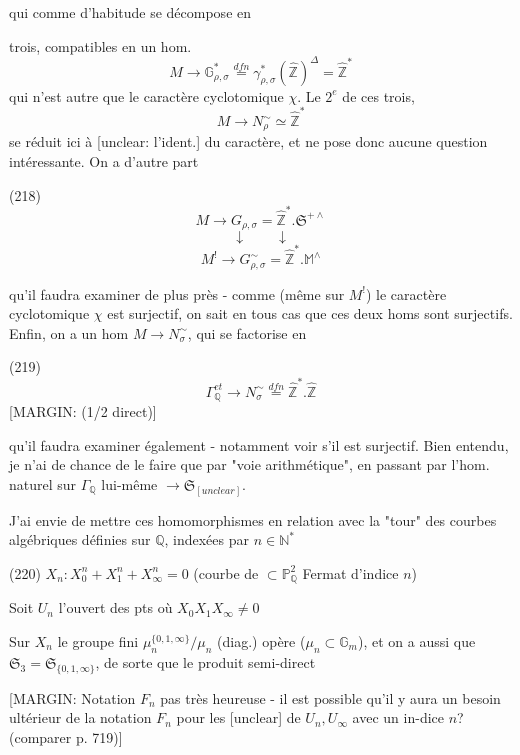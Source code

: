 qui comme d'habitude se décompose en

\newpage


trois, compatibles en un hom.
$$M \longrightarrow \mathbb{G}_{\rho, \sigma}^* \overset{dfn}{=} \gamma_{\rho, \sigma}^*(\hat{\mathbb{Z}})^\Delta = \hat{\mathbb{Z}}^*$$
qui n'est autre que le caractère cyclotomique $\chi$. Le $2^e$ de ces trois,
$$M \longrightarrow N_\rho^\sim \simeq \hat{\mathbb{Z}}^*$$
se réduit ici à [unclear: l'ident.] du caractère, et ne pose donc aucune question intéressante. On a d'autre part

(218)
$$M \longrightarrow G_{\rho, \sigma} = \hat{\mathbb{Z}}^* . \mathfrak{S}^{+ \wedge}$$
$$\downarrow \qquad \downarrow$$
$$M^! \longrightarrow G_{\rho, \sigma}^\sim = \hat{\mathbb{Z}}^* . \mathbb{M}^\wedge$$

qu'il faudra examiner de plus près - comme (même sur $M^!$) le caractère cyclotomique $\chi$ est surjectif, on sait en tous cas que ces deux homs sont surjectifs. Enfin, on a un hom $M \longrightarrow N_\sigma^\sim$, qui se factorise en

(219)
$$\Gamma_{\mathbb{Q}}^{et} \longrightarrow N_\sigma^\sim \overset{dfn}{=} \hat{\mathbb{Z}}^* . \hat{\mathbb{Z}}$$
[MARGIN: (1/2 direct)]

qu'il faudra examiner également - notamment voir s'il est surjectif.
Bien entendu, je n'ai de chance de le faire que par "voie arithmétique", en passant par l'hom. naturel sur $\Gamma_{\mathbb{Q}}$ lui-même $\longrightarrow \mathfrak{S}_{[unclear]}$.

\newpage


J'ai envie de mettre ces homomorphismes en
relation avec la "tour" des courbes algébriques
définies sur $\mathbb{Q}$, indexées par $n \in \mathbb{N}^\ast$

(220) $X_n : X_0^n + X_1^n + X_\infty^n = 0$ \qquad \qquad (courbe de
$\subset \mathbb{P}^2_{\mathbb{Q}}$ \qquad \qquad \qquad \qquad Fermat d'indice $n$)

Soit $U_n$ l'ouvert des pts où $X_0 X_1 X_\infty \neq 0$

Sur $X_n$ le groupe fini $\mu_n^{\{0,1,\infty\}} / \mu_n$ (diag.)
opère ($\mu_n \subset \mathbb{G}_m$), et on a aussi
que $\mathfrak{S}_3 = \mathfrak{S}_{\{0,1,\infty\}}$, de sorte que le
produit semi-direct

[MARGIN: Notation $F_n$ pas très heureuse - il est possible qu'il y aura un besoin ultérieur de la notation $F_n$ pour les [unclear] de $U_n, U_\infty$ avec un in-dice $n$? (comparer p. 719)]

